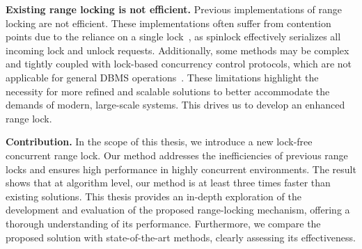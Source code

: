 \textbf{Existing range locking is not efficient.}
Previous implementations of range locking are not efficient. 
These implementations often suffer from contention points due to the reliance on a single lock~\parencite{linuxRangeLockImpl2013, song2013parallelizing}, as spinlock effectively serializes all incoming lock and unlock requests. 
Additionally, some methods may be complex and tightly coupled with lock-based concurrency control protocols, which are not applicable for general DBMS operations~\parencite{graefe2007hierarchical, andy2022database}. 
These limitations highlight the necessity for more refined and scalable solutions to better accommodate the demands of modern, large-scale systems. This drives us to develop an enhanced range lock.

\textbf{Contribution.} In the scope of this thesis, we introduce a new lock-free concurrent range lock. 
Our method addresses the inefficiencies of previous range locks and ensures high performance in highly concurrent environments. 
The result shows that at algorithm level, our method is at least three times faster than existing solutions. 
This thesis provides an in-depth exploration of the development and evaluation of the proposed range-locking mechanism, offering a thorough understanding of its performance. 
Furthermore, we compare the proposed solution with state-of-the-art methods, clearly assessing its effectiveness.